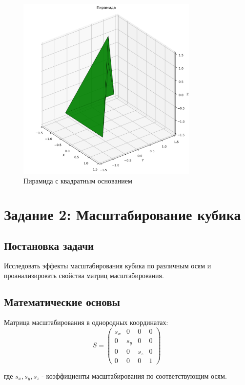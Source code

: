 \begin{figure}[H]
\centering
\includegraphics[width=0.8\textwidth]{images/task1/pyramid.png}
\caption{Пирамида с квадратным основанием}
\end{figure}

\section*{Задание 2: Масштабирование кубика}

\subsection*{Постановка задачи}
Исследовать эффекты масштабирования кубика по различным осям и проанализировать свойства матриц масштабирования.

\subsection*{Математические основы}
Матрица масштабирования в однородных координатах:
\begin{equation}
S = \begin{pmatrix}
s_x & 0 & 0 & 0 \\
0 & s_y & 0 & 0 \\
0 & 0 & s_z & 0 \\
0 & 0 & 0 & 1
\end{pmatrix}
\end{equation}

где $s_x, s_y, s_z$ - коэффициенты масштабирования по соответствующим осям.

